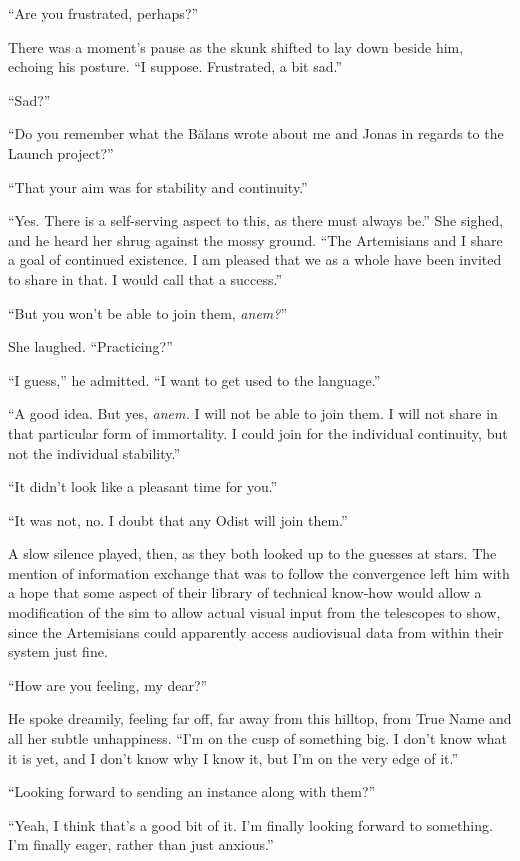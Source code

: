 ``Are you frustrated, perhaps?''

There was a moment's pause as the skunk shifted to lay down beside him, echoing his posture. ``I suppose. Frustrated, a bit sad.''

``Sad?''

``Do you remember what the Bălans wrote about me and Jonas in regards to the Launch project?''

``That your aim was for stability and continuity.''

``Yes. There is a self-serving aspect to this, as there must always be.'' She sighed, and he heard her shrug against the mossy ground. ``The Artemisians and I share a goal of continued existence. I am pleased that we as a whole have been invited to share in that. I would call that a success.''

``But you won't be able to join them, \emph{anem?}''

She laughed. ``Practicing?''

``I guess,'' he admitted. ``I want to get used to the language.''

``A good idea. But yes, \emph{anem.} I will not be able to join them. I will not share in that particular form of immortality. I could join for the individual continuity, but not the individual stability.''

``It didn't look like a pleasant time for you.''

``It was not, no. I doubt that any Odist will join them.''

A slow silence played, then, as they both looked up to the guesses at stars. The mention of information exchange that was to follow the convergence left him with a hope that some aspect of their library of technical know-how would allow a modification of the sim to allow actual visual input from the telescopes to show, since the Artemisians could apparently access audiovisual data from within their system just fine.

``How are you feeling, my dear?''

He spoke dreamily, feeling far off, far away from this hilltop, from True Name and all her subtle unhappiness. ``I'm on the cusp of something big. I don't know what it is yet, and I don't know why I know it, but I'm on the very edge of it.''

``Looking forward to sending an instance along with them?''

``Yeah, I think that's a good bit of it. I'm finally looking forward to something. I'm finally eager, rather than just anxious.''

